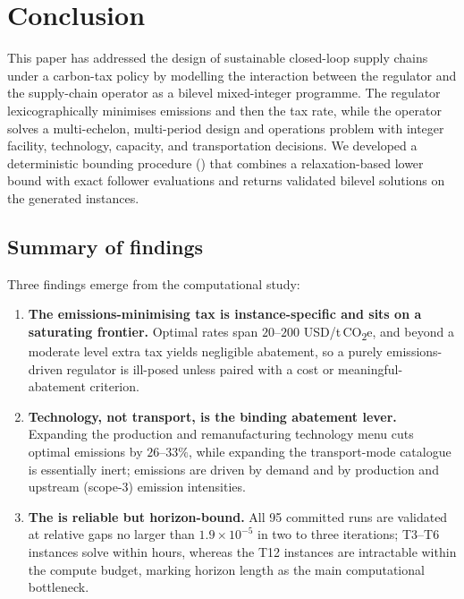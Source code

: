 
\section{Conclusion}
\label{sec:conclusion}

This paper has addressed the design of sustainable closed-loop
supply chains under a carbon-tax policy by modelling the interaction
between the regulator and the supply-chain operator as a bilevel
mixed-integer programme. The regulator lexicographically minimises
emissions and then the tax rate, while the operator solves a
multi-echelon, multi-period \CLSC design and operations problem with
integer facility, technology, capacity, and transportation decisions.
We developed a deterministic bounding procedure (\DBP) that combines
a relaxation-based lower bound with exact follower evaluations and
returns validated bilevel solutions on the generated instances.

\subsection{Summary of findings}
\label{sec:conc:summary}

Three findings emerge from the computational study:
\begin{enumerate}
  \item \textbf{The emissions-minimising tax is instance-specific and
        sits on a saturating frontier.} Optimal rates span
        $20$--$200$ USD/t\,CO\textsubscript{2}e, and beyond a
        moderate level extra tax yields negligible abatement, so a
        purely emissions-driven regulator is ill-posed unless paired
        with a cost or meaningful-abatement criterion.
  \item \textbf{Technology, not transport, is the binding abatement
        lever.} Expanding the production and remanufacturing
        technology menu cuts optimal emissions by $26$--$33\%$, while
        expanding the transport-mode catalogue is essentially inert;
        emissions are driven by demand and by production and upstream
        (scope-3) emission intensities.
  \item \textbf{The \DBP is reliable but horizon-bound.} All 95
        committed runs are validated at relative gaps no larger than
        $1.9\times10^{-5}$ in two to three iterations; T3--T6
        instances solve within hours, whereas the T12 instances are
        intractable within the compute budget, marking horizon length
        as the main computational bottleneck.
\end{enumerate}

